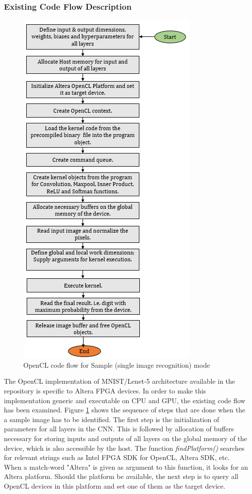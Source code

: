 \subsubsection{Existing Code Flow Description}
\label{3_1_3_2}
\begin{figure}[h!]
\centering
\includegraphics[width=0.5\linewidth]{figures/opencl_flow_lenet5.png}
\caption{OpenCL code flow for Sample (single image recognition) mode \cite{mnist-altera-opencl}}
\label{fig:opencl_flow_lenet5}
\end{figure}
The OpenCL implementation of MNIST/Lenet-5 architecture available in the repository \cite{mnist-altera-opencl} is specific to Altera FPGA devices. In order to make this implementation generic and executable on CPU and GPU, the existing code flow has been examined. Figure \ref{fig:opencl_flow_lenet5} shows the sequence of steps that are done when the a sample image has to be identified.\newline \newline
The first step is the initialization of parameters for all layers in the CNN. This is followed by allocation of buffers necessary for storing inputs and outputs of all layers on the global memory of the device, which is also accessible by the host. The function \textit{ findPlatform()} searches for relevant strings such as Intel FPGA SDK for OpenCL, Altera SDK, etc. When a match-word "Altera" is given as argument to this function, it looks for an Altera platform. Should the platform be available, the next step is to query all OpenCL devices in this platform and set one of them as the target device. \newline\newline
